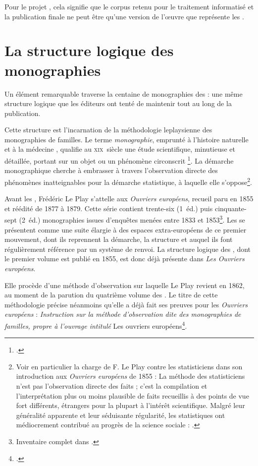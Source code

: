 Pour le projet \timeus{}, cela signifie que le corpus retenu pour le traitement informatisé et la publication finale ne peut être qu'une version de l'\oe{}uvre que représente les \odm.

\section{La structure logique des monographies}

Un élément remarquable traverse la centaine de monographies des \odm{} : une même structure logique que les éditeurs ont tenté de maintenir tout au long de la publication.

Cette structure est l'incarnation de la méthodologie leplaysienne des monographies de familles. Le terme \textit{monographie}, \og emprunté à l'histoire naturelle et à la médecine \fg{}, qualifie au \textsc{xix}\ieme ~siècle une \og étude scientifique, minutieuse et détaillée, portant sur un objet ou un phénomène circonscrit \fg{}\footnote{\cite[p. 12]{savoye2}.}. La démarche monographique cherche à embrasser à travers l'observation directe des phénomènes inatteignables pour la démarche statistique, à laquelle elle s'oppose\footnote{Voir en particulier la charge de F. Le Play contre les statisticiens dans son introduction aux \textit{Ouvriers européens} de 1855 : \og La méthode des statisticiens n'est pas l'observation directe des faits ; c'est la compilation et l'interprétation plus ou moins plausible de faits recueillis à des points de vue fort différents, étrangers pour la plupart à l'intérêt scientifique. Malgré leur généralité apparente et leur séduisante régularité, les statistiques ont médiocrement contribué au progrès de la science sociale \fg{} : \cite[p.~11]{oe1855}.}.

Avant les \odm, Frédéric Le Play s'attelle aux \textit{Ouvriers européens}, recueil paru en 1855 et réédité de 1877 à 1879. Cette série contient trente-six (1\iere{}~éd.) puis cinquante-sept (2\ieme{}~éd.) monographies issues d'enquêtes menées entre 1833 et 1853\footnote{Inventaire complet dans \cite[p. 106-112]{lorry}.}. Les \odm{} se présentent comme une suite élargie à des espaces extra-européens de ce premier mouvement, dont ils reprennent la démarche, la structure et auquel ils font régulièrement référence par un système de renvoi. La structure logique des \odm{}, dont le premier volume est publié en 1855, est donc déjà présente dans \textit{Les Ouvriers européens}.

Elle procède d'une méthode d'observation sur laquelle Le Play revient en 1862, au moment de la parution du quatrième volume des \odm{}. Le titre de cette méthodologie précise néanmoins qu'elle a déjà fait ses preuves pour les \textit{Ouvriers européens} : \textit{Instruction sur la méthode d'observation dite des monographies de familles, propre à l'ouvrage intitulé} Les ouvriers européens\footcite{instruction62}.

